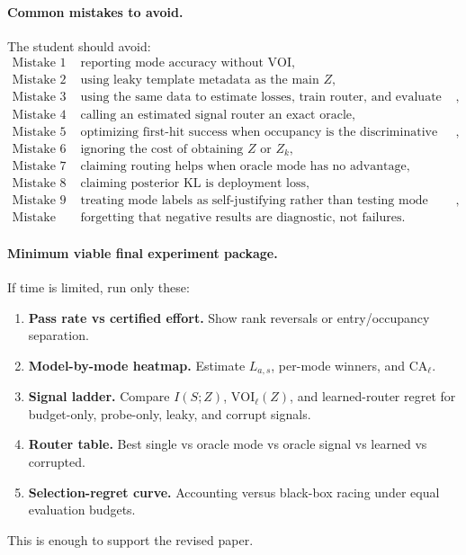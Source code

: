 \documentclass{article}
\begin{document}
\paragraph{Common mistakes to avoid.}
The student should avoid:
\[
\begin{array}{ll}
    \text{Mistake 1} & \text{reporting mode accuracy without VOI},\\
    \text{Mistake 2} & \text{using leaky template metadata as the main \(Z\)},\\
    \text{Mistake 3} & \text{using the same data to estimate losses, train router, and evaluate gains},\\
    \text{Mistake 4} & \text{calling an estimated signal router an exact oracle},\\
    \text{Mistake 5} & \text{optimizing first-hit success when occupancy is the discriminative metric},\\
    \text{Mistake 6} & \text{ignoring the cost of obtaining \(Z\) or \(Z_k\)},\\
    \text{Mistake 7} & \text{claiming routing helps when oracle mode has no advantage},\\
    \text{Mistake 8} & \text{claiming posterior KL is deployment loss},\\
    \text{Mistake 9} & \text{treating mode labels as self-justifying rather than testing mode robustness},\\
    \text{Mistake 10} & \text{forgetting that negative results are diagnostic, not failures}.
\end{array}
\]

\paragraph{Minimum viable final experiment package.}
If time is limited, run only these:
\begin{enumerate}[leftmargin=1.25em,itemsep=0.15em]
    \item \textbf{Pass rate vs certified effort.}
    Show rank reversals or entry/occupancy separation.
    \item \textbf{Model-by-mode heatmap.}
    Estimate \(L_{a,s}\), per-mode winners, and \(\mathrm{CA}_\ell\).
    \item \textbf{Signal ladder.}
    Compare \(I(S;Z)\), \(\mathrm{VOI}_\ell(Z)\), and learned-router regret for
    budget-only, probe-only, leaky, and corrupt signals.
    \item \textbf{Router table.}
    Best single vs oracle mode vs oracle signal vs learned vs corrupted.
    \item \textbf{Selection-regret curve.}
    Accounting versus black-box racing under equal evaluation budgets.
\end{enumerate}
This is enough to support the revised paper.
\end{document}
